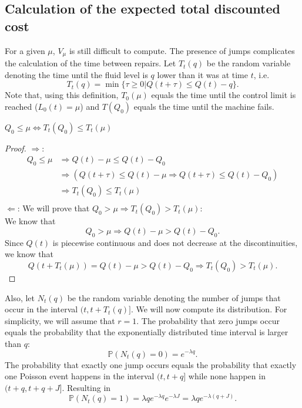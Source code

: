 \subsection{Calculation of the expected total discounted cost}
For a given $\mu$, $V_\mu$ is still difficult to compute.
The presence of jumps complicates the calculation of the time between repairs.
Let $T_t(q)$ be the random variable denoting the time until the fluid level is $q$ lower than it was at time $t$, i.e.
$$
T_t(q)=\min\{\tau\geq0|Q(t+\tau)\leq Q(t)-q\}.
$$
Note that, using this definition, $T_0(\mu)$ equals the time until the control limit is reached ($L_0(t)=\mu$) and $T(Q_0)$ equals the time until the machine fails.
\begin{lemma}
$Q_0\leq\mu\Leftrightarrow T_t(Q_0)\leq T_t(\mu)$
\end{lemma}
\begin{proof}
$\Rightarrow$: 
\begin{equation}
\begin{split}
Q_0\leq\mu&\Rightarrow Q(t)-\mu\leq Q(t)-Q_0\\
&\Rightarrow (Q(t+\tau)\leq Q(t)-\mu\Rightarrow Q(t+\tau)\leq Q(t)-Q_0)\\
&\Rightarrow T_t(Q_0)\leq T_t(\mu)\\
\end{split}
\end{equation}
$\Leftarrow$: We will prove that $Q_0>\mu\Rightarrow T_t(Q_0)> T_t(\mu)$:\\
We know that
$$
Q_0>\mu\Rightarrow Q(t)-\mu > Q(t)-Q_0.
$$
Since $Q(t)$ is piecewise continuous and does not decrease at the discontinuities, we know that 
$$
Q(t+T_t(\mu))=Q(t)-\mu>Q(t)-Q_0\Rightarrow T_t(Q_0)> T_t(\mu).
$$
\end{proof}
Also, let $N_t(q)$ be the random variable denoting the number of jumps that occur in the interval $(t,t+T_t(q)]$.
We will now compute its distribution.
For simplicity, we will assume that $r=1$.
The probability that zero jumps occur equals the probability that the exponentially distributed time interval is larger than $q$:
$$
\mathbb{P}(N_t(q)=0)=e^{-\lambda q}.
$$
The probability that exactly one jump occurs equals the probability that exactly one Poisson event happens in the interval $(t,t+q]$ while none happen in $(t+q,t+q+J]$. Resulting in
$$
\mathbb{P}(N_t(q)=1)=\lambda q e^{-\lambda q} e^{-\lambda J}=\lambda q e^{-\lambda (q+J)}.
$$

